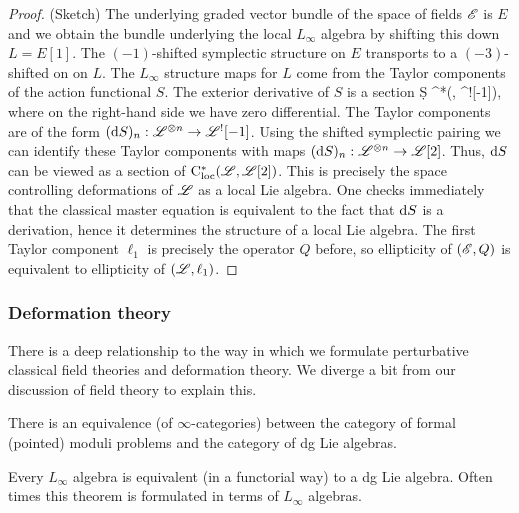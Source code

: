 \begin{proof} (Sketch) 
The underlying graded vector bundle of the space of fields $\mathscr E$ is $E$ and we obtain the bundle underlying the local $L_\infty$ algebra by shifting this down $L = E[1]$. 
The $(-1)$-shifted symplectic structure on $E$ transports to a $(-3)$-shifted on on $L$. 
The $L_\infty$ structure maps for $L$ come from the Taylor components of the action functional $S$. 
The exterior derivative of $S$ is a section
\ben
\d S \in \cloc^*(\sL, \sL^![-1]),
\een
where on the right-hand side we have zero differential.
The Taylor components are of the form $({\rm d} S)_n : \mathscr L^{\otimes n} \to \mathscr L^![-1]$. 
Using the shifted symplectic pairing we can identify these Taylor components with maps $({\rm d} S)_n : \mathscr L^{\otimes n} \to \mathscr L[2]$. 
Thus, ${\rm d} S$ can be viewed as a section of ${\rm C}_{\rm loc}^*(\mathscr L, \mathscr L[2])$. 
This is precisely the space controlling deformations of $\mathscr L$ as a local Lie algebra.
One checks immediately that the classical master equation is equivalent to the fact that ${\rm d} S$ is a derivation, hence it determines the structure of a local Lie algebra. 
The first Taylor component $\ell_1$ is precisely the operator $Q$ before, so ellipticity of $(\mathscr E, Q)$ is equivalent to ellipticity of $(\mathscr L, \ell_1)$. 
\end{proof}


\subsubsection{Deformation theory} \label{sec: formal moduli}

There is a deep relationship to the way in which we formulate perturbative classical field theories and deformation theory. 
We diverge a bit from our discussion of field theory to explain this.

\begin{thm}
There is an equivalence (of $\infty$-categories) between the category of formal (pointed) moduli problems and the category of dg Lie algebras.
\end{thm}

\begin{rmk} 
Every $L_\infty$ algebra is equivalent (in a functorial way) to a dg Lie algebra.
Often times this theorem is formulated in terms of $L_\infty$ algebras.
\end{rmk}

